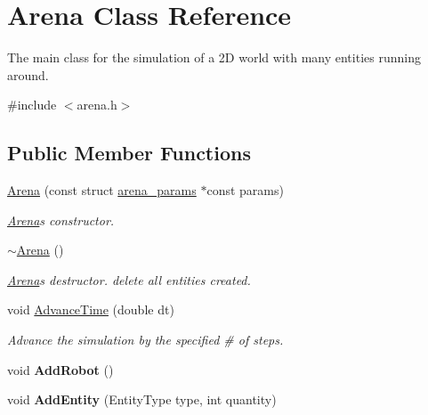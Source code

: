 \hypertarget{classArena}{}\section{Arena Class Reference}
\label{classArena}


The main class for the simulation of a 2D world with many entities running around.  




{\ttfamily \#include $<$arena.\+h$>$}

\subsection*{Public Member Functions}
\begin{DoxyCompactItemize}
\item 
\hyperlink{classArena_ac442d519facc5feebfd7612a53817e9a}{Arena} (const struct \hyperlink{structarena__params}{arena\+\_\+params} $\ast$const params)
\begin{DoxyCompactList}\small\item\em \hyperlink{classArena}{Arena}\textquotesingle{}s constructor. \end{DoxyCompactList}\item 
\hyperlink{classArena_ae21b399e9e3f6b8ac4ecc44d7d1667fc}{$\sim$\+Arena} ()\hypertarget{classArena_ae21b399e9e3f6b8ac4ecc44d7d1667fc}{}\label{classArena_ae21b399e9e3f6b8ac4ecc44d7d1667fc}

\begin{DoxyCompactList}\small\item\em \hyperlink{classArena}{Arena}\textquotesingle{}s destructor. {\ttfamily delete} all entities created. \end{DoxyCompactList}\item 
void \hyperlink{classArena_ad92d8b2e1593b652445e31d173977fc6}{Advance\+Time} (double dt)
\begin{DoxyCompactList}\small\item\em Advance the simulation by the specified \# of steps. \end{DoxyCompactList}\item 
void {\bfseries Add\+Robot} ()\hypertarget{classArena_a2573d164b44d0333d630f6f12a358320}{}\label{classArena_a2573d164b44d0333d630f6f12a358320}

\item 
void {\bfseries Add\+Entity} (Entity\+Type type, int quantity)\hypertarget{classArena_a9e00ef1a079d49d648359952fcfaa9f3}{}\label{classArena_a9e00ef1a079d49d648359952fcfaa9f3}


\end{DoxyCompactItemize}
